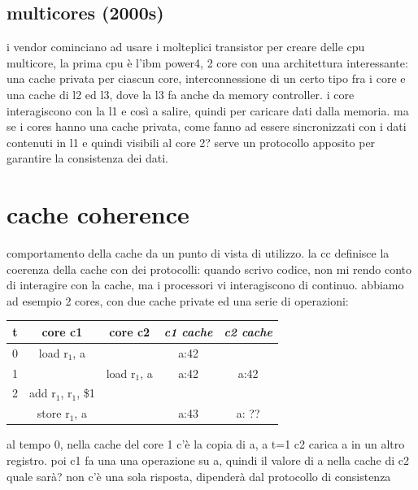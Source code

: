 \documentclass[12pt, oneside]{extbook} %
\begin{document}
\subsection{multicores (2000s)}
i vendor cominciano ad usare i molteplici transistor per creare delle cpu multicore, la prima cpu è l'ibm power4, 2 core con una architettura interessante: una cache privata per ciascun core, interconnessione di un certo tipo fra i core e una cache di l2 ed l3, dove la l3 fa anche da memory controller. i core interagiscono con la l1 e così a salire, quindi per caricare dati dalla memoria. ma se i cores hanno una cache privata, come fanno ad essere sincronizzati con i dati contenuti in l1 e quindi visibili al core 2? serve un protocollo apposito per garantire la consistenza dei dati.

\section{cache coherence}
comportamento della cache da un punto di vista di utilizzo. la cc definisce la coerenza della cache con dei protocolli: quando scrivo codice, non mi rendo conto di interagire con la cache, ma i processori vi interagiscono di continuo. abbiamo ad esempio 2 cores, con due cache private ed una serie di operazioni:
\begin{table}[!h]
	\begin{tabular}{|c|c|c|c|c|}
		t & \textbf{core c1} & \textbf{
		core c2} & \textit{c1 cache} & \textit{c2 cache}\\
		\hline
		0 & load r$_1$, a &  & a:42 & \\
		\hline
		1 &  & load r$_1$, a & a:42 & a:42\\
		\hline
		2 & add r$_1$, r$_1$, \$1 & & & \\
		\hline
		 & store r$_1$, a & & a:43 & a: ??\\
	\end{tabular}
\end{table}
al tempo 0, nella cache del core 1 c'è la copia di a, a t=1 c2 carica a in un altro registro. poi c1 fa una una operazione su a, quindi il valore di a nella cache di c2 quale sarà? non c'è una sola risposta, dipenderà dal protocollo di consistenza
\end{document}
